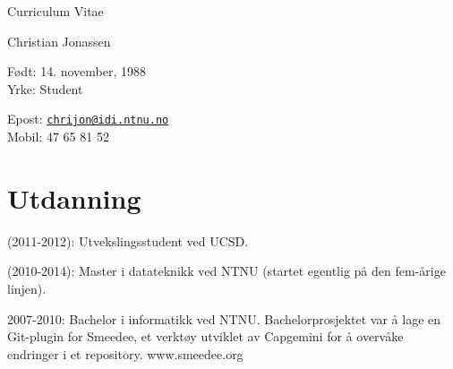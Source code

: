 \documentclass[letterpaper]{article}
\def\name{Christian Jonassen}
\renewenvironment{itemize}{
  \begin{list}{}{
    \setlength{\leftmargin}{1.5em}
  }
}{
  \end{list}
}
\begin{document}

\centerline{\LARGE Curriculum Vitae}

\centerline{}

\centerline{\huge \name}

\vspace{0.25in}

\begin{minipage}[t]{0.5\textwidth}
  Født: 14. november, 1988 \\
  Yrke: Student
\end{minipage}
\begin{minipage}[t]{0.5\textwidth}
  Epost: \href{mailto:chrijon@idi.ntnu.no}{\tt chrijon@idi.ntnu.no} \\
  Mobil: 47 65 81 52
\end{minipage}

\section*{Utdanning}

\begin{itemize}
  \item (2011-2012): Utvekslingsstudent ved UCSD.
  \item (2010-2014): Master i datateknikk ved NTNU (startet egentlig
    på den fem-årige linjen).

  \item 2007-2010: Bachelor i informatikk ved NTNU. Bachelorprosjektet
    var å lage en Git-plugin for Smeedee, et verktøy utviklet av
    Capgemini for å overvåke endringer i et repository. www.smeedee.org
\end{itemize}
\end{document}
